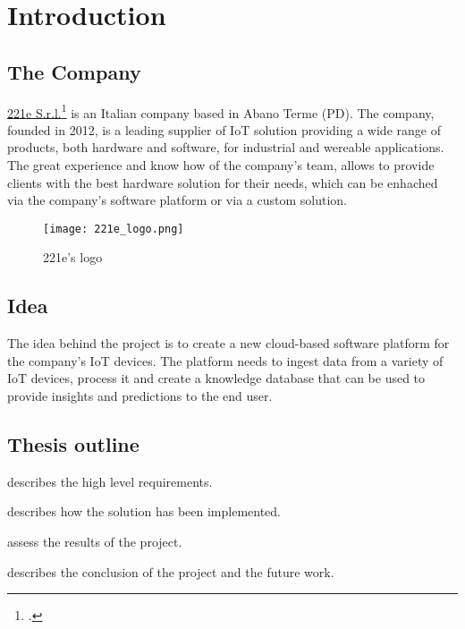 \chapter{Introduction}
\label{cap:introduction}

\section{The Company}
\href{https://www.221e.com/about-us}{221e S.r.l.}\footcite{site:221e} is an Italian company based in Abano Terme (PD). 
The company, founded in 2012, is a leading supplier of IoT solution providing  a wide range of products,
both hardware and software, for industrial and wereable applications.
The great experience and know how of the company's team, allows to provide clients with the best hardware solution
for their needs, which can be enhached via the company's software platform or via a custom solution.
\begin{figure}[htbp]
    \centering
    \texttt{[image: 221e\_logo.png]}
    \caption{221e's logo}
\end{figure}

\section{Idea}

The idea behind the project is to create a new cloud-based software platform for the company's IoT devices.
The platform needs to ingest data from a variety of IoT devices, process it and create a knowledge database that can be used to
provide insights and predictions to the end user.

\section{Thesis outline}

\begin{description}
    \item[{\hyperref[cap:requirements]{The second chapter}}] describes the high level requirements.
    \item 
    \item[{\hyperref[cap:method]{The fourth chapter}}] describes how the solution has been implemented.
    \item[{\hyperref[cap:results]{The fifth chapter}}] assess the results of the project.
    \item[{\hyperref[cap:conclusion]{The last chapter}}] describes the conclusion of the project and the future work.
\end{description}
